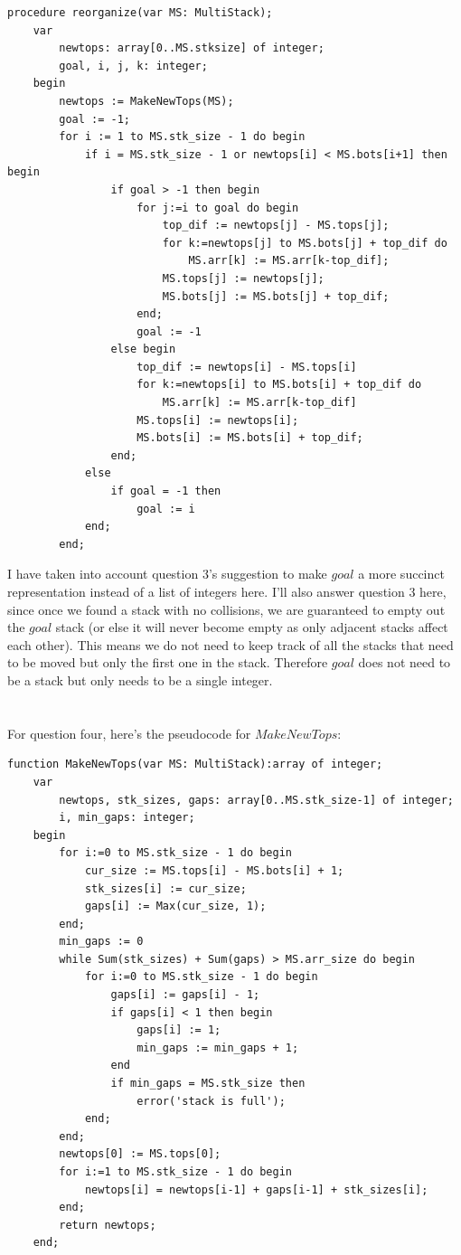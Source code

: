 \documentclass[12pt]{report}
\begin{document}
\begin{verbatim}
procedure reorganize(var MS: MultiStack);
    var 
        newtops: array[0..MS.stksize] of integer;
        goal, i, j, k: integer;
    begin
        newtops := MakeNewTops(MS);
        goal := -1;
        for i := 1 to MS.stk_size - 1 do begin
            if i = MS.stk_size - 1 or newtops[i] < MS.bots[i+1] then begin
                if goal > -1 then begin
                    for j:=i to goal do begin
                        top_dif := newtops[j] - MS.tops[j];
                        for k:=newtops[j] to MS.bots[j] + top_dif do
                            MS.arr[k] := MS.arr[k-top_dif];
                        MS.tops[j] := newtops[j];
                        MS.bots[j] := MS.bots[j] + top_dif;
                    end;
                    goal := -1
                else begin
                    top_dif := newtops[i] - MS.tops[i]
                    for k:=newtops[i] to MS.bots[i] + top_dif do
                        MS.arr[k] := MS.arr[k-top_dif]
                    MS.tops[i] := newtops[i];
                    MS.bots[i] := MS.bots[i] + top_dif;
                end;
            else
                if goal = -1 then
                    goal := i
            end;
        end;
\end{verbatim}
I have taken into account question 3's suggestion 
to make $goal$ a more succinct representation instead of a list of integers here.
I'll also answer question 3 here, since once we found a stack with no collisions,
we are guaranteed to empty out the $goal$ stack 
(or else it will never become empty as only adjacent stacks affect each other).
This means we do not need to keep track of all the stacks that need to be moved 
but only the first one in the stack. 
Therefore $goal$ does not need to be a stack but only needs to be a single integer.\\\\
\pagebreak
\\For question four, here's the pseudocode for $MakeNewTops$:
\begin{verbatim}
function MakeNewTops(var MS: MultiStack):array of integer;
    var
        newtops, stk_sizes, gaps: array[0..MS.stk_size-1] of integer;
        i, min_gaps: integer;
    begin
        for i:=0 to MS.stk_size - 1 do begin
            cur_size := MS.tops[i] - MS.bots[i] + 1;
            stk_sizes[i] := cur_size;
            gaps[i] := Max(cur_size, 1);
        end;
        min_gaps := 0
        while Sum(stk_sizes) + Sum(gaps) > MS.arr_size do begin
            for i:=0 to MS.stk_size - 1 do begin
                gaps[i] := gaps[i] - 1;
                if gaps[i] < 1 then begin
                    gaps[i] := 1;
                    min_gaps := min_gaps + 1;
                end
                if min_gaps = MS.stk_size then
                    error('stack is full');
            end;
        end;
        newtops[0] := MS.tops[0];
        for i:=1 to MS.stk_size - 1 do begin
            newtops[i] = newtops[i-1] + gaps[i-1] + stk_sizes[i];
        end;
        return newtops;
    end;
\end{verbatim}
\end{document}
